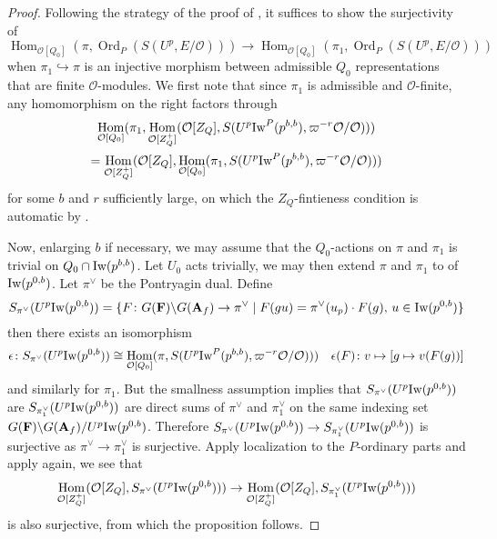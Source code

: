 \documentclass[leqno]{amsart}
\theoremstyle{definition}
\theoremstyle{remark}
\newcommand{\oo}{\mathcal{O}}
\newcommand{\A}{\mathbf A}
\DeclareMathOperator{\Hom}{Hom}
\DeclareMathOperator{\Ord}{Ord} %
\newcommand{\F}{{\mathbf{F}}} %
\newcommand{\Iw}{\textnormal{Iw}} %
\begin{document}
\begin{proof}
	Following the strategy of the proof of 
	\cite[Prop 3.2.4]{pan}, 
	it suffices to show the surjectivity of
	\[
		\Hom_{\oo[Q_0]}(\pi,\Ord_P(S(U^p,E/\oo)))\to 
		\Hom_{\oo[Q_0]}(\pi_1,\Ord_P(S(U^p,E/\oo)))
	\]
	when $\pi_{1}\hookrightarrow \pi$ 
	is an injective morphism between admissible $Q_0$
	representations that are finite $\oo$-modules.
	We first note that since $\pi_1$ is admissible
	and $\oo$-finite,
	any homomorphism on the right factors 
	through 
	\begin{multline*}
		\Hom_{\oo[Q_0]}(\pi_1,
		\Hom_{\oo[Z_Q^+]}
		(\oo[Z_Q], S(U^p\Iw^P(p^{b,b}),
		\varpi^{-r}\oo/\oo)))\\=
		\Hom_{\oo[Z_Q^+]}(\oo[Z_Q],
		\Hom_{\oo[Q_0]}(\pi_1, 
		S(U^p\Iw^P(p^{b,b}),\varpi^{-r}\oo/\oo)))
	\end{multline*}
	for some $b$ and  $r$ sufficiently large,
	on which 
	the $Z_Q$-fintieness condition is automatic
	by \cite[Lem 3.1.5]{emeI}.

	Now, enlarging $b$ if necessary,
	we may assume that 
	the $Q_0$-actions on 
	$\pi$ and $\pi_1$ is trivial on
	$Q_0\cap \Iw(p^{b,b})$. 
	Let $U_0$ acts trivially,
	we may then extend $\pi$ and  $\pi_1$
	to of $\Iw(p^{0,b})$.
	Let $\pi^\vee$ be the Pontryagin dual.
	Define
	\[
		S_{\pi^\vee}(U^p\Iw(p^{0,b}))=
		\{
			F\colon G(\F)\backslash G(\A_f)\to 
			\pi^\vee\mid 
			F(gu)=\pi^\vee(u_p)\cdot F(g),\,
			u\in \Iw(p^{0,b})
		\}
	\]
	then there exists an isomorphism
	\[
		\epsilon\colon 
		S_{\pi^\vee}(U^p\Iw(p^{0,b}))\cong 
		\Hom_{\oo[Q_0]}(\pi,
		S(U^p\Iw^P(p^{b,b}),\varpi^{-r}\oo/\oo)))
		\quad \epsilon(F)\colon
		v\mapsto [g\mapsto v(F(g))]
	\]
	and similarly for $\pi_1$.
	But the smallness assumption implies
	that $S_{\pi^\vee}(U^p\Iw(p^{0,b}))$
	are $S_{\pi_1^\vee}(U^p\Iw(p^{0,b}))$
	are direct sums of 
	$\pi^\vee$ and  $\pi_1^\vee$ 
	on the same indexing set
	$G(\F)\backslash G(\A_f)/U^p\Iw(p^{0,b})$.
	Therefore 
	$S_{\pi^\vee}(U^p\Iw(p^{0,b}))\to 
	S_{\pi_1^\vee}(U^p\Iw(p^{0,b}))$ is 
	surjective
	as $\pi^\vee\to \pi_1^\vee$ is surjective.
	Apply localization to the $P$-ordinary parts
	and apply \cite[Lem 3.1.5]{emeI} again,
	we see that
	\[
		\Hom_{\oo[Z_Q^+]}(\oo[Z_Q],
		S_{\pi^\vee}(U^p\Iw(p^{0,b})))\to 
		\Hom_{\oo[Z_Q^+]}(\oo[Z_Q],
		S_{\pi^\vee_1}(U^p\Iw(p^{0,b})))
	\]
	is also surjective, from which 
	the proposition follows.
\end{proof}
\end{document}
